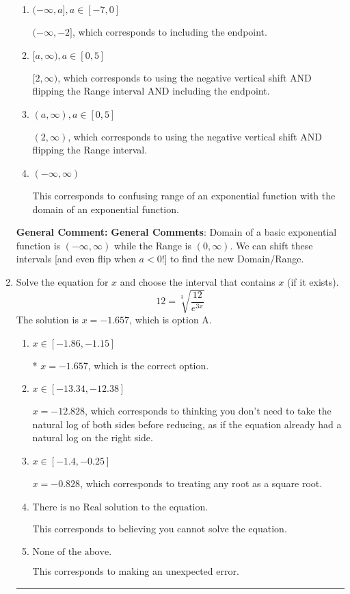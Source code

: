 \documentclass{extbook}[14pt]
\newcommand{\litem}[1]{\item #1

\rule{\textwidth}{0.4pt}}
\begin{document}
\begin{enumerate}
{\begin{enumerate}[label=\Alph*.]
* $(-\infty, -2)$, which is the correct option.
\item \( (-\infty, a], a \in [-7, 0] \)

$(-\infty, -2]$, which corresponds to including the endpoint.
\item \( [a, \infty), a \in [0, 5] \)

$[2, \infty)$, which corresponds to using the negative vertical shift AND flipping the Range interval AND including the endpoint.
\item \( (a, \infty), a \in [0, 5] \)

$(2, \infty)$, which corresponds to using the negative vertical shift AND flipping the Range interval.
\item \( (-\infty, \infty) \)

This corresponds to confusing range of an exponential function with the domain of an exponential function.
\end{enumerate}

\textbf{General Comment:} \textbf{General Comments}: Domain of a basic exponential function is $(-\infty, \infty)$ while the Range is $(0, \infty)$. We can shift these intervals [and even flip when $a<0$!] to find the new Domain/Range.
}
\litem{
 Solve the equation for $x$ and choose the interval that contains $x$ (if it exists).
\[  12 = \sqrt[3]{\frac{12}{e^{3x}}} \]The solution is \( x = -1.657 \), which is option A.\begin{enumerate}[label=\Alph*.]
\item \( x \in [-1.86, -1.15] \)

* $x = -1.657$, which is the correct option.
\item \( x \in [-13.34, -12.38] \)

$x = -12.828$, which corresponds to thinking you don't need to take the natural log of both sides before reducing, as if the equation already had a natural log on the right side.
\item \( x \in [-1.4, -0.25] \)

$x = -0.828$, which corresponds to treating any root as a square root.
\item \( \text{There is no Real solution to the equation.} \)

This corresponds to believing you cannot solve the equation.
\item \( \text{None of the above.} \)

This corresponds to making an unexpected error.
\end{enumerate}

}
\end{enumerate}
\end{document}
